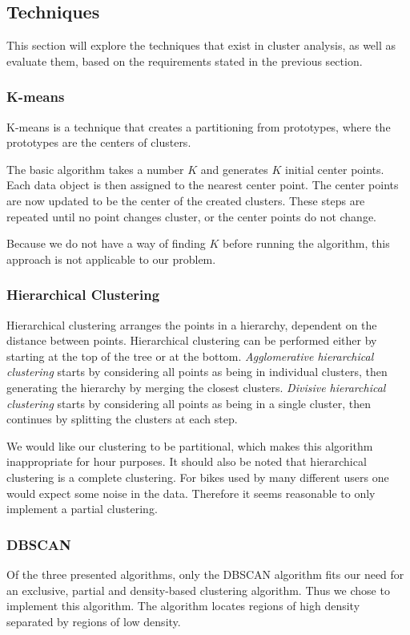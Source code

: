 \subsection{Techniques}
This section will explore the techniques that exist in cluster analysis, as well as evaluate them, based on the requirements stated in the previous section.

\subsubsection{K-means}
K-means is a technique that creates a partitioning from prototypes, where the prototypes are the centers of clusters.

The basic algorithm takes a number $K$ and generates $K$ initial center points.
Each data object is then assigned to the nearest center point.
The center points are now updated to be the center of the created clusters.
These steps are repeated until no point changes cluster, or the center points do not change.

Because we do not have a way of finding $K$ before running the algorithm, this approach is not applicable to our problem.

\subsubsection{Hierarchical Clustering}
Hierarchical clustering arranges the points in a hierarchy, dependent on the distance between points.
Hierarchical clustering can be performed either by starting at the top of the tree or at the bottom.
\textit{Agglomerative hierarchical clustering} starts by considering all points as being in individual clusters, then generating the hierarchy by merging the closest clusters.
\textit{Divisive hierarchical clustering} starts by considering all points as being in a single cluster, then continues by splitting the clusters at each step.

We would like our clustering to be partitional, which makes this algorithm inappropriate for hour purposes.
It should also be noted that hierarchical clustering is a complete clustering.
For bikes used by many different users one would expect some noise in the data.
Therefore it seems reasonable to only implement a partial clustering.

\subsubsection{DBSCAN}\label{clustering:DBSCAN}
Of the three presented algorithms, only the DBSCAN algorithm fits our need for an exclusive, partial and density-based clustering algorithm.
Thus we chose to implement this algorithm.
The algorithm locates regions of high density separated by regions of low density.

